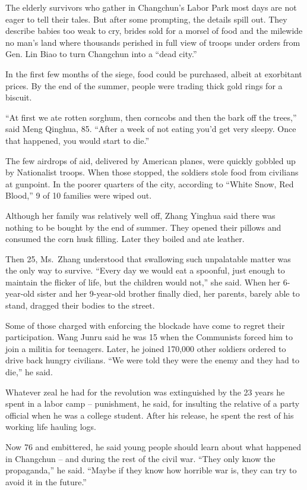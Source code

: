 ﻿\documentclass[12pt]{article}
\begin{document}
The elderly survivors who gather in Changchun's Labor Park most days are not eager to tell their
tales. But after some prompting, the details spill out. They describe babies too weak to cry, brides
sold for a morsel of food and the milewide no man's land where thousands perished in full view of
troops under orders from Gen. Lin Biao to turn Changchun into a ``dead city.''

In the first few months of the siege, food could be purchased, albeit at exorbitant prices. By the
end of the summer, people were trading thick gold rings for a biscuit.

``At first we ate rotten sorghum, then corncobs and then the bark off the trees,'' said Meng
Qinghua, 85. ``After a week of not eating you'd get very sleepy. Once that happened, you would start
to die.''

The few airdrops of aid, delivered by American planes, were quickly gobbled up by Nationalist
troops. When those stopped, the soldiers stole food from civilians at gunpoint. In the poorer
quarters of the city, according to ``White Snow, Red Blood,'' 9 of 10 families were wiped out.

Although her family was relatively well off, Zhang Yinghua said there was nothing to be bought by
the end of summer. They opened their pillows and consumed the corn husk filling. Later they boiled
and ate leather.

Then 25, Ms.~Zhang understood that swallowing such unpalatable matter was the only way to survive.
``Every day we would eat a spoonful, just enough to maintain the flicker of life, but the children
would not,'' she said. When her 6-year-old sister and her 9-year-old brother finally died, her
parents, barely able to stand, dragged their bodies to the street.

Some of those charged with enforcing the blockade have come to regret their participation. Wang
Junru said he was 15 when the Communists forced him to join a militia for teenagers. Later, he
joined 170,000 other soldiers ordered to drive back hungry civilians. ``We were told they were the
enemy and they had to die,'' he said.

Whatever zeal he had for the revolution was extinguished by the 23 years he spent in a labor camp --
punishment, he said, for insulting the relative of a party official when he was a college student.
After his release, he spent the rest of his working life hauling logs.

Now 76 and embittered, he said young people should learn about what happened in Changchun -- and
during the rest of the civil war. ``They only know the propaganda,'' he said. ``Maybe if they know
how horrible war is, they can try to avoid it in the future.''
\end{document}
